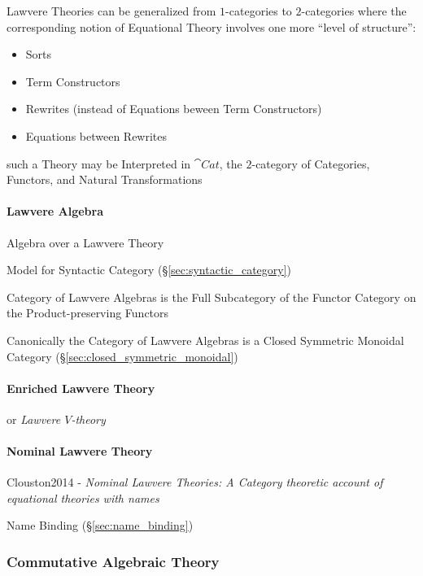 Lawvere Theories can be generalized from $1$-categories to $2$-categories where
the corresponding notion of Equational Theory involves one more ``level of
structure'':
\begin{itemize}
  \item Sorts
  \item Term Constructors
  \item Rewrites (instead of Equations beween Term Constructors)
  \item Equations between Rewrites
\end{itemize}

such a Theory may be Interpreted in $\cat{Cat}$, the $2$-category of Categories,
Functors, and Natural Transformations



\paragraph{Lawvere Algebra}\label{sec:lawvere_algebra}\hfill

Algebra over a Lawvere Theory

Model for Syntactic Category (\S\ref{sec:syntactic_category})

Category of Lawvere Algebras is the Full Subcategory of the Functor
Category on the Product-preserving Functors %

Canonically the Category of Lawvere Algebras is a Closed Symmetric
Monoidal Category (\S\ref{sec:closed_symmetric_monoidal})



\paragraph{Enriched Lawvere Theory}\label{sec:enriched_lawvere}\hfill
\cite{hyland-power06}

or \emph{Lawvere $V$-theory}



\paragraph{Nominal Lawvere Theory}\label{sec:nominal_lawvere_theory}\hfill

Clouston2014 - \emph{Nominal Lawvere Theories: A Category theoretic account of
  equational theories with names}

Name Binding (\S\ref{sec:name_binding})



\subsubsection{Commutative Algebraic Theory}
\label{sec:commutative_algebraic_theory}

